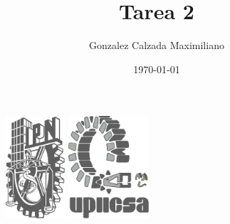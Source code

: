 \documentclass{article}
\title{Tarea 2}
\author{Gonzalez Calzada Maximiliano}
\date{\today}
\begin{document}
    \thispagestyle{empty}
        
    \begin{figure}[ht]
            \includegraphics[width=2.2cm]{IPN_Logo.pdf}
            \label{LogoIPN}
        \endminipage
        \hspace{0.60\textwidth}
            \includegraphics[width=3cm]{UPIICSA_Logo.pdf}
            \label{LogoUPIICSA}
        \endminipage
    \end{figure}
	
\end{document}
